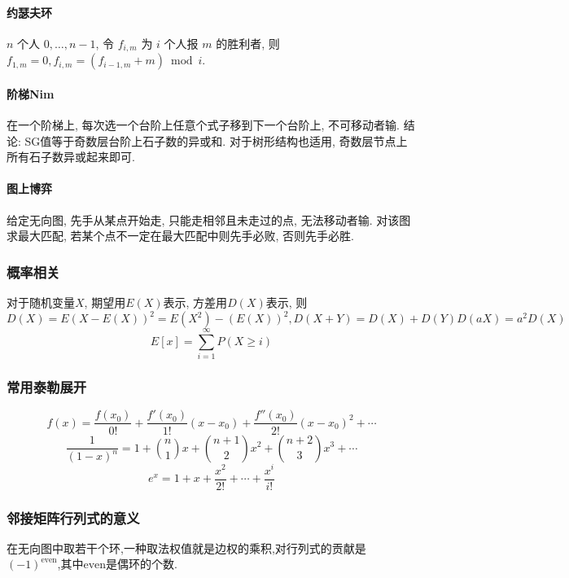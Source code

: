 \begin{small}
\begin{multicols}{2}
\paragraph{约瑟夫环}$n$ 个人 $0,\dots,n-1$, 令 $f_{i,m}$ 为 $i$ 个人报 $m$ 的胜利者, 则 $f_{1,m}=0,f_{i,m}=(f_{i-1,m}+m)\bmod i$. 
\paragraph{阶梯Nim} 在一个阶梯上, 每次选一个台阶上任意个式子移到下一个台阶上, 不可移动者输. 结论: SG值等于奇数层台阶上石子数的异或和. 对于树形结构也适用, 奇数层节点上所有石子数异或起来即可.
\paragraph{图上博弈} 给定无向图, 先手从某点开始走, 只能走相邻且未走过的点, 无法移动者输. 对该图求最大匹配, 若某个点不一定在最大匹配中则先手必败, 否则先手必胜.
\end{multicols}


\subsubsection{概率相关}
对于随机变量$X$, 期望用$E(X)$表示, 方差用$D(X)$表示, 则$D(X)=E(X-E(X))^2=E(X^2)-(E(X))^2,D(X+Y)=D(X)+D(Y)D(aX)=a^2D(X)$
\[E[x]=\sum_{i=1}^{\infty}P(X\geq i)\]
\subsubsection{常用泰勒展开}
\[f(x)=\frac{f(x_0)}{0!}+\frac{f'(x_0)}{1!}(x-x_0)+\frac{f''(x_0)}{2!}(x-x_0)^2+\cdots\]
\[\frac{1}{(1-x)^n}=1+\binom{n}{1}x+\binom{n+1}{2}x^2+\binom{n+2}{3}x^3+\cdots \]
\[e^x=1+x+\frac{x^2}{2!}+\cdots+\frac{x^i}{i!}\]

\subsubsection{邻接矩阵行列式的意义}
在无向图中取若干个环,一种取法权值就是边权的乘积,对行列式的贡献是$(-1)^{\mathrm{even}}$,其中$\mathrm{even}$是偶环的个数.


\end{small}
